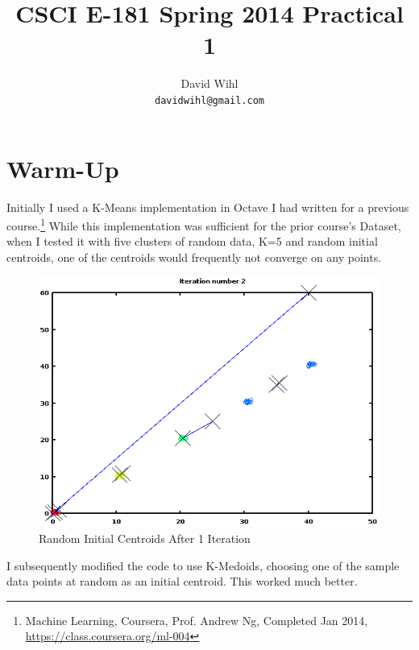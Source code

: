 \documentclass[11pt, oneside]{article}   	%
\title{CSCI E-181 Spring 2014 Practical 1}
\author{David Wihl\\
     \texttt{davidwihl@gmail.com}}
\begin{document}
\maketitle
\section*{Warm-Up}


\par Initially I used a K-Means implementation in Octave I had written for a previous course.\footnote{Machine Learning, Coursera, Prof. Andrew Ng, Completed Jan 2014, \url{https://class.coursera.org/ml-004}} While this implementation was sufficient for the prior course's Dataset, when I tested it with five clusters of random data, K=5 and random initial centroids, one of the centroids would frequently not converge on any points.

\begin{figure}[h!] %
\centering
\includegraphics[scale=0.6]{randominitialClusters}
\caption{Random Initial Centroids After 1 Iteration}
\end{figure}

I subsequently modified the code to use K-Medoids, choosing one of the sample data points at random as an initial centroid. This worked much better.
\end{document}

